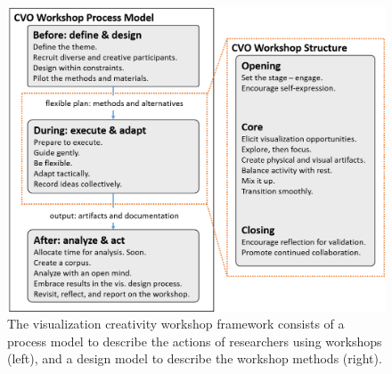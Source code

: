 \begin{figure}
    \centering
    \includegraphics[width=0.8\columnwidth]{figures/framework-overview.png}
    \caption{ The visualization creativity workshop framework consists of a process model to describe the actions of researchers using workshops (left), and a design model to describe the workshop methods (right).}
    \label{fig:cascading-process}
\end{figure}



